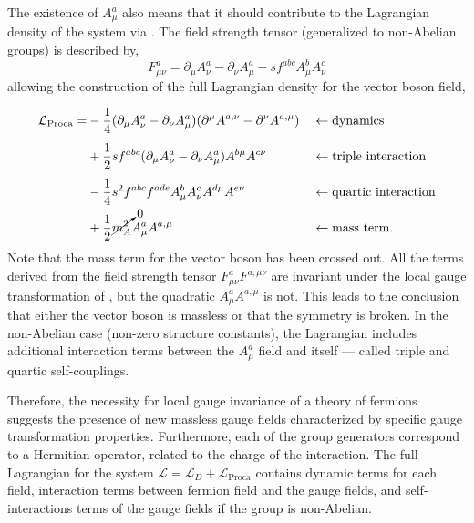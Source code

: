The existence of $A_\mu^a$ also means that it should contribute to the Lagrangian density of the system via .
The field strength tensor (generalized to non-Abelian groups) is described by,
\begin{equation}
    \label{eq:field_strength_tensor}
    F_{\mu\nu}^a = \partial_\mu A_\nu^a - \partial_\nu A_\mu^a - s f^{abc} A_\mu^b A_\nu^c
\end{equation}
allowing the construction of the full Lagrangian density for the vector boson field,
\begin{align}
    \label{eq:boson}
    \mathcal{L}_\text{Proca} =
     & \vphantom{\cancelto{0}{m_A^2}} -\frac{1}{4}(\partial_\mu A_\nu^a - \partial_\nu A_\mu^a) (\partial^\mu A^{a,\nu} - \partial^\nu A^{a,\mu}) &  & \leftarrow \text{dynamics}            \\
     & \vphantom{\cancelto{0}{m_A^2}} + \frac{1}{2} s f^{abc} (\partial_\mu A_\nu^a - \partial_\nu A_\mu^a) A^{b\mu} A^{c\nu}                     &  & \leftarrow \text{triple interaction}  \\
     & \vphantom{\cancelto{0}{m_A^2}} - \frac{1}{4} s^2 f^{abc} f^{ade} A_\mu^b A_\nu^c A^{d\mu} A^{e\nu}                                         &  & \leftarrow \text{quartic interaction} \\
     & + \frac{1}{2} \cancelto{0}{m_A^2} A_\mu^a A^{a,\mu}                                                                                        &  & \leftarrow \text{mass term}.
\end{align}
Note that the mass term for the vector boson has been crossed out.
All the terms derived from the field strength tensor $F_{\mu\nu}^a F^{a,\mu\nu}$ are invariant under the local gauge transformation of , but the quadratic $A_\mu^a A^{a,\mu}$ is not.
This leads to the conclusion that either the vector boson is massless or that the symmetry is broken.
In the non-Abelian case (non-zero structure constants), the Lagrangian includes additional interaction terms between the $A_\mu^a$ field and itself --- called triple and quartic self-couplings.

Therefore, the necessity for local gauge invariance of a theory of fermions suggests the presence of new massless gauge fields characterized by specific gauge transformation properties.
Furthermore, each of the group generators correspond to a Hermitian operator, related to the charge of the interaction.
The full Lagrangian for the system $\mathcal{L} = \mathcal{L}_D + \mathcal{L}_\text{Proca}$ contains dynamic terms for each field, interaction terms between fermion field and the gauge fields, and self-interactions terms of the gauge fields if the group is non-Abelian.

